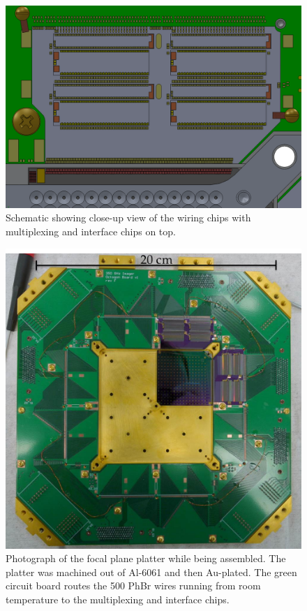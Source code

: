 \begin{figure}
\centering
\includegraphics[width=5.00in]{images/ch5-wiring-chip-schematic.png}
\caption{
  Schematic showing close-up view of the wiring chips with multiplexing and interface chips on top.
}
\label{fig:ch5-wiring-chip-schematic}
\end{figure}

\begin{figure}
\centering
\includegraphics[width=6.00in]{images/ch5-focal-plane-platter.jpg}
\caption{
  Photograph of the focal plane platter while being assembled.
  The platter was machined out of Al-6061 and then Au-plated.
  The green circuit board routes the 500 PhBr wires running from room temperature to the multiplexing and interface chips.
}
\label{fig:ch5-focal-plane-platter}
\end{figure}
